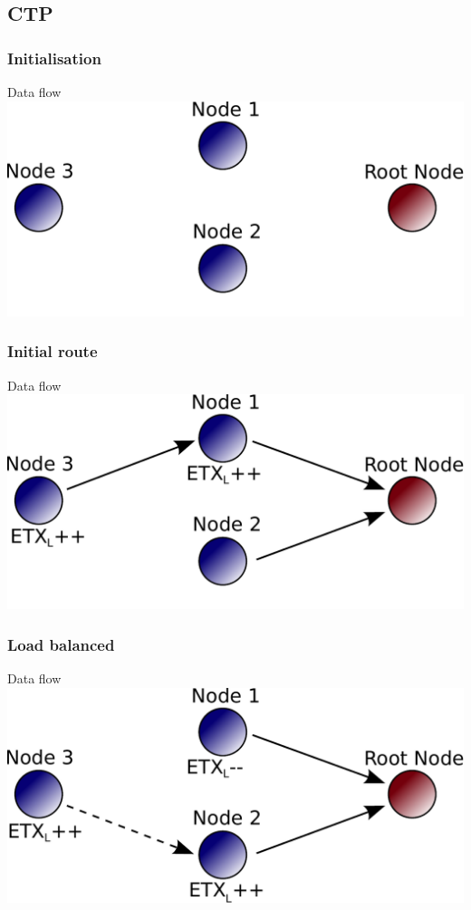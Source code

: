 \documentclass{beamer}
\begin{document}
\subsection{CTP}

\begin{frame}[fragile]
  \frametitle{Initialisation}
  \footnotesize{
    \begin{block}{Data flow}
        \includegraphics[width=\textwidth]{Images/Demo_plain}
    \end{block}
  }
\end{frame}


\begin{frame}[fragile]
  \frametitle{Initial route}
  \footnotesize{
    \begin{block}{Data flow}
        \includegraphics[width=\textwidth]{Images/Demo_s1}
    \end{block}
  }
\end{frame}

\begin{frame}[fragile]
  \frametitle{Load balanced}
  \footnotesize{
    \begin{block}{Data flow}
        \includegraphics[width=\textwidth]{Images/Demo_s2}
    \end{block}
  }
\end{frame}
\end{document}
